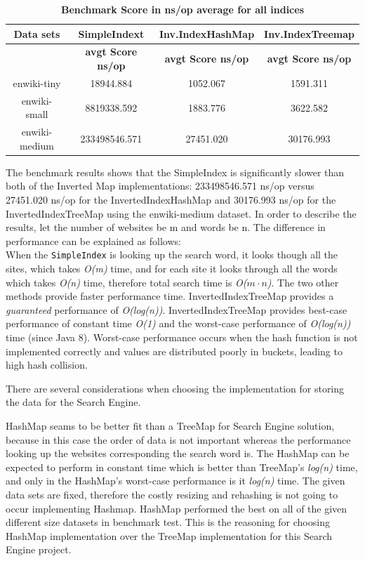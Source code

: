 \begin{table}[!htbp]
    \caption{\textbf{Benchmark Score in ns/op average for all indices}}
    \begin{tabular}{|c|c|c|c|}
        \hline
        \textbf{Data sets} & \textbf{SimpleIndext} & \textbf{Inv.IndexHashMap} & \textbf{Inv.IndexTreemap} \\ \hline
        \textbf{} & \textbf{avgt Score ns/op} & \textbf{avgt Score ns/op} & \textbf{avgt Score ns/op} \\ \hline
        enwiki-tiny &18944.884&1052.067&1591.311 \\ \hline
        enwiki-small &8819338.592&1883.776&3622.582\\ \hline
        enwiki-medium &233498546.571&27451.020&30176.993 \\ \hline
    \end{tabular}
    \label{table:result}
\end{table}


The benchmark results shows that the SimpleIndex is significantly slower than both of the Inverted Map implementations: 233498546.571 ns/op versus 27451.020 ns/op for the InvertedIndexHashMap and 30176.993 ns/op for the InvertedIndexTreeMap using the enwiki-medium dataset.
In order to describe the results, let the number of websites be m and words be n.
The difference in performance can be explained as follows: \\
When the {\tt SimpleIndex} is looking up the search word, it looks though all the sites, which takes \textit{O(m)} time, and for each site it looks through all the words which takes \textit{O(n)} time, therefore total search time is \textit{O($m\cdot n$)}. The two other methods provide faster performance time. InvertedIndexTreeMap provides a \textit{guaranteed} performance of \textit{O(log(n))}. InvertedIndexTreeMap provides best-case performance of constant time \textit{O(1)} and the worst-case performance of \textit{O(log(n))} time (since Java 8). Worst-case performance occurs when the hash function is not implemented correctly and values are distributed poorly in buckets, leading to high hash collision.

There are several considerations when choosing the implementation for storing the data for the Search Engine.

HashMap seams to be better fit than a TreeMap for Search Engine solution, because in this case the order of data is not important whereas the performance looking up the websites corresponding the search word is. The HashMap can be expected to perform in constant time which is better than TreeMap's \textit{log(n)} time, and only in the HashMap's worst-case performance is it \textit{log(n)} time. The given data sets are fixed, therefore the costly resizing and rehashing is not going to occur implementing Hashmap. HashMap performed the best on all of the given different size datasets in benchmark test. This is the reasoning for choosing HashMap implementation over the TreeMap implementation for this Search Engine project.




